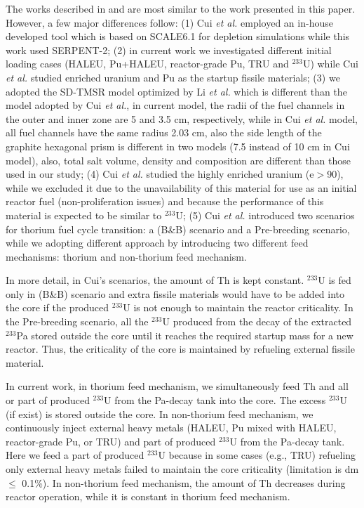 \documentclass[answers,11pt]{exam}
\begin{document}
\begin{questions}
\begin{solution}
                The works described in \cite{cui2017transition} and
                \cite{cui2018possible} are most similar to the work
                presented in this paper. However, a few major differences
                follow: (1) Cui \emph{et al.} employed an in-house developed tool which is based on SCALE6.1 for depletion simulations while this work used SERPENT-2; (2) in current work we investigated different initial loading cases (HALEU, Pu+HALEU, reactor-grade Pu, TRU and $^{233}$U) while Cui \emph{et al.} studied enriched uranium and Pu as the startup fissile materials; (3) we adopted the SD-TMSR model optimized by Li \emph{et al.} \cite{li_optimization_2018} which is different than the model adopted by Cui \emph{et al.}, in current model, the radii of the fuel channels in the outer and inner zone are 5 and 3.5 cm, respectively, while in Cui \emph{et al.} model, all fuel channels have the same radius 2.03 cm, also the side length of the graphite hexagonal prism is different in two models (7.5 instead of 10 cm in Cui model), also, total salt volume, density and composition are different than those used in our study; (4) Cui \emph{et al.} studied the highly enriched uranium (e$>$90), while we excluded it due to the unavailability of this material for use as an initial reactor fuel (non-proliferation issues) and because the performance of this material is expected to be similar to $^{233}$U; (5) Cui \emph{et al.} introduced two scenarios for thorium fuel cycle transition: a (B\&B) scenario and a Pre-breeding scenario, while we adopting different approach by introducing two different feed mechanisms: thorium and non-thorium feed mechanism.
                
                In more detail, in Cui's scenarios, the amount of Th is kept constant. $^{233}$U is fed only in (B\&B) scenario and extra fissile materials would have to be added into the core if the produced $^{233}$U is not enough to maintain the reactor criticality. In the Pre-breeding scenario, all the $^{233}$U produced from the decay of the extracted $^{233}$Pa stored outside the core until it reaches the required startup mass for a new reactor. Thus, the criticality of the core is maintained by refueling external fissile material.
                
                In current work, in thorium feed mechanism, we simultaneously feed Th and all or part of produced $^{233}$U from the Pa-decay tank into the core. The excess $^{233}$U (if exist) is stored outside the core. In non-thorium feed mechanism, we continuously inject external heavy metals (HALEU, Pu mixed with HALEU, reactor-grade Pu, or TRU) and part of produced $^{233}$U from the Pa-decay tank. Here we feed a part of produced $^{233}$U because in some cases (e.g., TRU) refueling only external heavy metals failed to maintain the core criticality (limitation is dm $\leq$ 0.1\%). In non-thorium feed mechanism, the amount of Th decreases during reactor operation, while it is constant in thorium feed mechanism.
                

\end{solution}
\end{questions}
\end{document}
